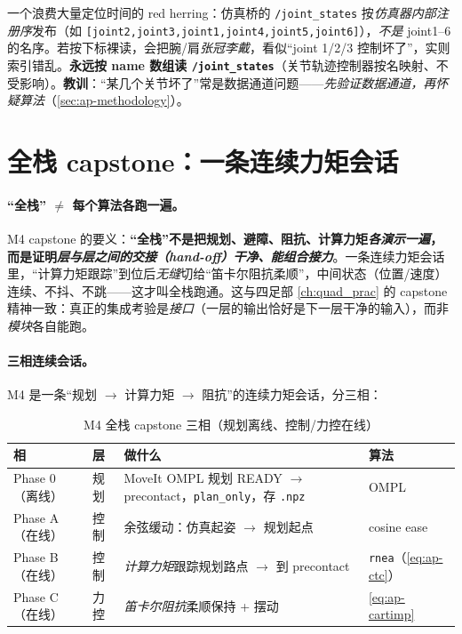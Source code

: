 \begin{pitfall}\label{pit:ap-jointorder}
一个浪费大量定位时间的 red herring：仿真桥的 \texttt{/joint\_states} 按\emph{仿真器内部注册序}发布（如 \texttt{[joint2,joint3,joint1,joint4,joint5,joint6]}），\emph{不是} joint1--6 的名序。若按下标裸读，会把腕/肩\emph{张冠李戴}，看似“joint 1/2/3 控制坏了”，实则索引错乱。\textbf{永远按 name 数组读 \texttt{/joint\_states}}（关节轨迹控制器按名映射、不受影响）。\textbf{教训}：“某几个关节坏了”常是数据通道问题——\emph{先验证数据通道，再怀疑算法}（\cref{sec:ap-methodology}）。
\end{pitfall}

\section{全栈 capstone：一条连续力矩会话}
\label{sec:ap-capstone}

\paragraph{“全栈” $\ne$ 每个算法各跑一遍。}
\begin{insight}\label{ins:ap-fullstack}
M4 capstone 的要义：\textbf{“全栈”不是把规划、避障、阻抗、计算力矩\emph{各演示一遍}，而是证明\emph{层与层之间的交接（hand-off）干净、能组合接力}}。一条连续力矩会话里，“计算力矩跟踪”到位后\emph{无缝}切给“笛卡尔阻抗柔顺”，中间状态（位置/速度）连续、不抖、不跳——这才叫全栈跑通。这与四足部 \cref{ch:quad_prac} 的 capstone 精神一致：真正的集成考验是\emph{接口}（一层的输出恰好是下一层干净的输入），而非\emph{模块}各自能跑。
\end{insight}

\paragraph{三相连续会话。}
M4 是一条“规划 $\to$ 计算力矩 $\to$ 阻抗”的连续力矩会话，分三相：

\begin{table}[H]\centering\small
\caption{M4 全栈 capstone 三相（规划离线、控制/力控在线）}
\begin{tabular}{p{} p{} p{} p{}}
\toprule
相 & 层 & 做什么 & 算法 \\
\midrule
Phase 0（离线）& 规划 & MoveIt OMPL 规划 READY $\to$ precontact，\texttt{plan\_only}，存 \texttt{.npz} & OMPL \\
Phase A（在线）& 控制 & 余弦缓动：仿真起姿 $\to$ 规划起点 & cosine ease \\
Phase B（在线）& 控制 & \emph{计算力矩}跟踪规划路点 $\to$ 到 precontact & \texttt{rnea}（\cref{eq:ap-ctc}）\\
Phase C（在线）& 力控 & \emph{笛卡尔阻抗}柔顺保持 + 摆动 & \cref{eq:ap-cartimp} \\
\bottomrule
\end{tabular}
\label{tab:ap-capstone}
\end{table}

